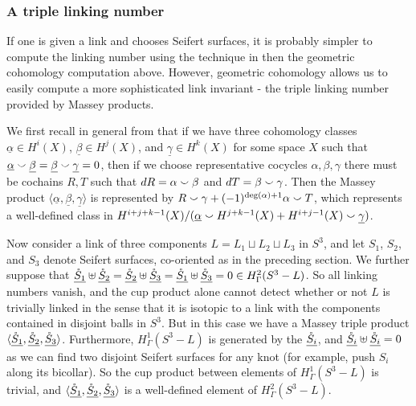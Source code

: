 \subsubsection{A triple linking number}

If one is given a link and chooses Seifert surfaces, it is probably simpler to compute the linking number using the technique in \cite{Ro76} then the geometric cohomology computation above.
However, geometric cohomology allows us to easily compute a more sophisticated link invariant - the triple linking number provided by Massey products.

We first recall in general from \cite{UM57} that if we have three cohomology classes $\underline{\alpha} \in H^i(X)$, $\underline{\beta} \in H^j(X)$, and $\underline{\gamma} \in H^k(X)$ for some space $X$ such that $\underline{\alpha} \smallsmile \underline{\beta} = \underline{\beta} \smallsmile \underline{\gamma} =0$, then if we choose representative cocycles $\alpha, \beta, \gamma$ there must be cochains $R,T$ such that $dR = \alpha \smallsmile \beta$ and $dT = \beta \smallsmile \gamma$.
Then the Massey product $\langle \underline{\alpha}, \underline{\beta}, \underline \gamma \rangle$ is represented by $R \smallsmile \gamma +(-1)^{\deg(\alpha) +1} \alpha \smallsmile T$, which represents a well-defined class in $H^{i+j+k-1}(X)/(\underline{\alpha} \smallsmile H^{j+k-1}(X) + H^{i+j-1}(X) \smallsmile \underline{\gamma})$.

Now consider a link of three components $L = L_1 \sqcup L_2 \sqcup L_3$ in $S^3$, and let $S_1$, $S_2$, and $S_3$ denote Seifert surfaces, co-oriented as in the preceding section.
We further suppose that $\underline{\mathring{S}_1} \uplus \underline{\mathring{S}_2} = \underline{\mathring{S}_2} \uplus \underline{\mathring{S}_3} = \underline{\mathring{S}_1} \uplus \underline{\mathring{S}_3} = 0 \in H^2_\Gamma(S^3-L)$.
So all linking numbers vanish, and the cup product alone cannot detect whether or not $L$ is trivially linked in the sense that it is isotopic to a link with the components contained in disjoint balls in $S^3$.
But in this case we have a Massey triple product $\langle \underline{\mathring{S}_1}, \underline{\mathring{S}_2}, \underline{\mathring{S}_3}\rangle$.
Furthermore, $H^1_\Gamma(S^3 - L)$ is generated by the $\underline{\mathring{S}_i}$, and $\underline{\mathring{S}_i} \uplus \underline{\mathring{S}_i} = 0$ as we can find two disjoint Seifert surfaces for any knot (for example, push $S_i$ along its bicollar).
So the cup product between elements of $H^1_\Gamma(S^3-L)$ is trivial, and $\langle \underline{\mathring{S}_1}, \underline{\mathring{S}_2}, \underline{\mathring{S}_3}\rangle$ is a well-defined element of $H^2_\Gamma(S^3 - L)$.

